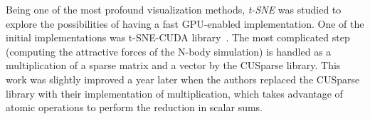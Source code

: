 

Being one of the most profound visualization methods, \emph{t-SNE} was studied to explore the possibilities of having a fast GPU-enabled implementation. One of the initial implementations was t-SNE-CUDA library~\cite{chan2018t}. The most complicated step (computing the attractive forces of the N-body simulation) is handled as a multiplication of a sparse matrix and a vector by the CUSparse library. This work was slightly improved a year later \cite{chan2019gpu} when the authors replaced the CUSparse library with their implementation of multiplication, which takes advantage of atomic operations to perform the reduction in scalar sums.

